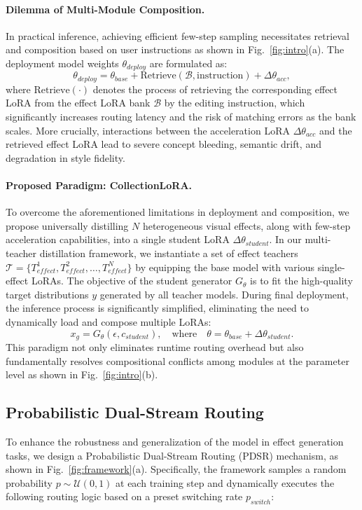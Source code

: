\documentclass{llmxive}
\begin{document}
\paragraph{Dilemma of Multi-Module Composition.}
In practical inference, achieving efficient few-step sampling necessitates retrieval and composition based on user instructions as shown in Fig.~\ref{fig:intro}(a). The deployment model weights $\theta_{deploy}$ are formulated as:
\begin{equation}
    \theta_{deploy}=\theta_{base}+\text{Retrieve}(\mathcal{B},\text{instruction})+\Delta\theta_{acc},
\end{equation}
where $\text{Retrieve}(\cdot)$ denotes the process of retrieving the corresponding effect LoRA from the effect LoRA bank $\mathcal{B}$ by the editing instruction, which significantly increases routing latency and the risk of matching errors as the bank scales. More crucially, interactions between the acceleration LoRA $\Delta\theta_{acc}$ and the retrieved effect LoRA lead to severe concept bleeding, semantic drift, and degradation in style fidelity.
\paragraph{Proposed Paradigm: CollectionLoRA.}
To overcome the aforementioned limitations in deployment and composition, we propose universally distilling $N$ heterogeneous visual effects, along with few-step acceleration capabilities, into a single student LoRA $\Delta\theta_{student}$.
In our multi-teacher distillation framework, we instantiate a set of effect teachers $\mathcal{T}=\{T_{effect}^{1},T_{effect}^{2},\dots,T_{effect}^{N}\}$ by equipping the base model with various single-effect LoRAs.
The objective of the student generator $G_{\theta}$ is to fit the high-quality target distributions $y$ generated by all teacher models.
During final deployment, the inference process is significantly simplified, eliminating the need to dynamically load and compose multiple LoRAs:
\begin{equation}
    x_{g}=G_{\theta}(\epsilon,c_{student}),\quad\text{where}\quad\theta=\theta_{base}+\Delta\theta_{student}.
\end{equation}
This paradigm not only eliminates runtime routing overhead but also fundamentally resolves compositional conflicts among modules at the parameter level as shown in Fig.~\ref{fig:intro}(b).

\subsection{Probabilistic Dual-Stream Routing}\label{method:4_2}
To enhance the robustness and generalization of the model in effect generation tasks, we design a Probabilistic Dual-Stream Routing (PDSR) mechanism, as shown in Fig.~\ref{fig:framework}(a).
Specifically, the framework samples a random probability $p \sim \mathcal{U}(0,1)$ at each training step and dynamically executes the following routing logic based on a preset switching rate $p_{switch}$:
\end{document}
